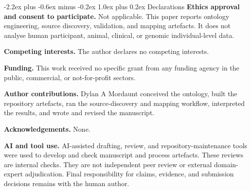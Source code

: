 \documentclass[11pt]{article}
\makeatletter
\renewcommand\section{\@startsection{section}{1}{\z@}%
  {-2.2ex plus -0.6ex minus -0.2ex}%
  {1.0ex plus 0.2ex}%
  {\normalfont\Large\bfseries\color{uogtoInk}}}
\makeatother
\begin{document}
\section{Declarations}
\textbf{Ethics approval and consent to participate.} Not applicable. This paper reports ontology engineering, source discovery, validation, and mapping artefacts. It does not analyse human participant, animal, clinical, or genomic individual-level data.

\textbf{Competing interests.} The author declares no competing interests.

\textbf{Funding.} This work received no specific grant from any funding agency in the public, commercial, or not-for-profit sectors.

\textbf{Author contributions.} Dylan A Mordaunt conceived the ontology, built the repository artefacts, ran the source-discovery and mapping workflow, interpreted the results, and wrote and revised the manuscript.

\textbf{Acknowledgements.} None.

\textbf{AI and tool use.} AI-assisted drafting, review, and repository-maintenance tools were used to develop and check manuscript and process artefacts. These reviews are internal checks. They are not independent peer review or external domain-expert adjudication. Final responsibility for claims, evidence, and submission decisions remains with the human author.
\end{document}
